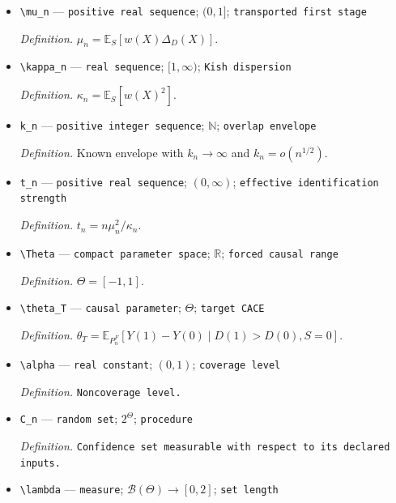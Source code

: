 \documentclass{article}
\begin{document}
\begin{itemize}
  \par\smallskip\noindent\emph{Definition.} \(\mu_{Y,n}=\mathbb E_S[w(X)\Delta_Y(X)]\).
  \item \texttt{\textbackslash{}\allowbreak{}mu\_\allowbreak{}n} --- \texttt{positive real sequence}; \((0,1]\); \texttt{transported first stage}
  \par\smallskip\noindent\emph{Definition.} \(\mu_n=\mathbb E_S[w(X)\Delta_D(X)]\).
  \item \texttt{\textbackslash{}\allowbreak{}kappa\_\allowbreak{}n} --- \texttt{real sequence}; \([1,\infty)\); \texttt{Kish dispersion}
  \par\smallskip\noindent\emph{Definition.} \(\kappa_n=\mathbb E_S[w(X)^2]\).
  \item \texttt{k\_\allowbreak{}n} --- \texttt{positive integer sequence}; \(\mathbb N\); \texttt{overlap envelope}
  \par\smallskip\noindent\emph{Definition.} Known envelope with \(k_n\to\infty\) and \(k_n=o(n^{1/2})\).
  \item \texttt{t\_\allowbreak{}n} --- \texttt{positive real sequence}; \((0,\infty)\); \texttt{effective identification strength}
  \par\smallskip\noindent\emph{Definition.} \(t_n=n\mu_n^2/\kappa_n\).
  \item \texttt{\textbackslash{}\allowbreak{}Theta} --- \texttt{compact parameter space}; \(\mathbb R\); \texttt{forced causal range}
  \par\smallskip\noindent\emph{Definition.} \(\Theta=[-1,1]\).
  \item \texttt{\textbackslash{}\allowbreak{}theta\_\allowbreak{}T} --- \texttt{causal parameter}; \(\Theta\); \texttt{target CACE}
  \par\smallskip\noindent\emph{Definition.} \(\theta_T=\mathbb E_{P_n^F}[Y(1)-Y(0)\mid D(1)>D(0),S=0]\).
  \item \texttt{\textbackslash{}\allowbreak{}alpha} --- \texttt{real constant}; \((0,1)\); \texttt{coverage level}
  \par\smallskip\noindent\emph{Definition.} \texttt{Noncoverage level.}
  \item \texttt{C\_\allowbreak{}n} --- \texttt{random set}; \(2^{\Theta}\); \texttt{procedure}
  \par\smallskip\noindent\emph{Definition.} \texttt{Confidence set measurable with respect to its declared inputs.}
  \item \texttt{\textbackslash{}\allowbreak{}lambda} --- \texttt{measure}; \(\mathcal B(\Theta)\to[0,2]\); \texttt{set length}

\end{itemize}
\end{document}
